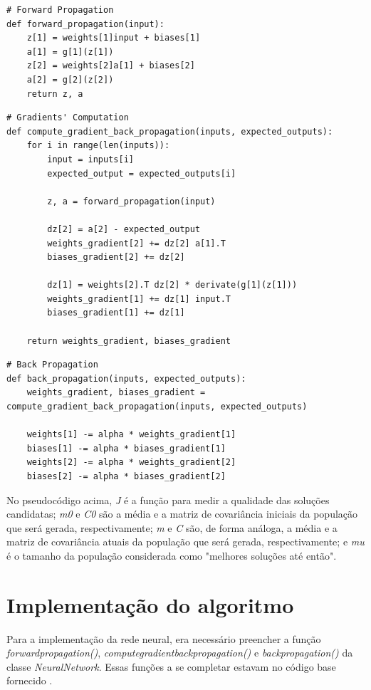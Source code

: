 \documentclass[conference]{IEEEtran}
\begin{document}
\begin{lstlisting}
# Forward Propagation
def forward_propagation(input):
	z[1] = weights[1]input + biases[1]
	a[1] = g[1](z[1])
	z[2] = weights[2]a[1] + biases[2]
	a[2] = g[2](z[2])
	return z, a
\end{lstlisting}

\begin{lstlisting}
# Gradients' Computation
def compute_gradient_back_propagation(inputs, expected_outputs):
	for i in range(len(inputs)):
		input = inputs[i]
		expected_output = expected_outputs[i]
		
		z, a = forward_propagation(input)

		dz[2] = a[2] - expected_output
		weights_gradient[2] += dz[2] a[1].T
		biases_gradient[2] += dz[2]

		dz[1] = weights[2].T dz[2] * derivate(g[1](z[1]))
		weights_gradient[1] += dz[1] input.T
		biases_gradient[1] += dz[1]

	return weights_gradient, biases_gradient
\end{lstlisting}

\begin{lstlisting}
# Back Propagation
def back_propagation(inputs, expected_outputs):
	weights_gradient, biases_gradient = compute_gradient_back_propagation(inputs, expected_outputs)

	weights[1] -= alpha * weights_gradient[1]
	biases[1] -= alpha * biases_gradient[1]
	weights[2] -= alpha * weights_gradient[2]
	biases[2] -= alpha * biases_gradient[2]
\end{lstlisting}

No pseudocódigo acima, \textit{J} é a função para medir a qualidade das soluções candidatas; \textit{m0} e \textit{C0} são a média e a matriz de covariância iniciais da população que será gerada, respectivamente; \textit{m} e \textit{C} são, de forma análoga, a média e a matriz de covariância atuais da população que será gerada, respectivamente; e \textit{mu} é o tamanho da população considerada como "melhores soluções até então".

\section{Implementação do algoritmo}
Para a implementação da rede neural, era necessário preencher a função \textit{forward\underline{\space}propagation()}, \textit{compute\underline{\space}gradient\underline{\space}back\underline{\space}propagation()} e \textit{back\underline{\space}propagation()} da classe \textit{NeuralNetwork}. Essas funções a se completar estavam no código base fornecido \cite{roteiro}.  
\end{document}
